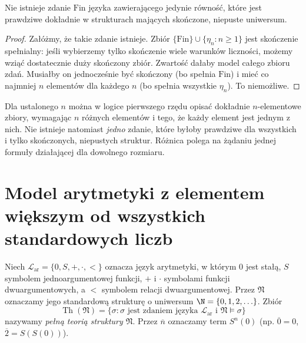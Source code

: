 \begin{wniosek}\label{cor:compactness-no-finiteness-sentence}
Nie istnieje zdanie $\mathrm{Fin}$ języka zawierającego jedynie równość, które jest prawdziwe dokładnie w strukturach mających skończone, niepuste uniwersum.
\end{wniosek}
\begin{proof}
Załóżmy, że takie zdanie istnieje. Zbiór $\{\mathrm{Fin}\}\cup\{\eta_n:n\ge1\}$ jest skończenie spełnialny: jeśli wybierzemy tylko skończenie wiele warunków liczności, możemy wziąć dostatecznie duży skończony zbiór. Zwartość dałaby model całego zbioru zdań. Musiałby on jednocześnie być skończony (bo spełnia $\mathrm{Fin}$) i mieć co najmniej $n$ elementów dla każdego $n$ (bo spełnia wszystkie $\eta_n$). To niemożliwe.
\end{proof}

\begin{uwaga}
Dla ustalonego $n$ można w logice pierwszego rzędu opisać dokładnie $n$-elementowe zbiory, wymagając $n$ różnych elementów i tego, że każdy element jest jednym z nich. Nie istnieje natomiast \emph{jedno} zdanie, które byłoby prawdziwe dla wszystkich i tylko skończonych, niepustych struktur. Różnica polega na żądaniu jednej formuły działającej dla dowolnego rozmiaru.
\end{uwaga}

\section{Model arytmetyki z elementem większym od wszystkich standardowych liczb}\label{sec:compactness-nonstandard}
\begin{definicja}\label{def:compactness-theory-n}
Niech $\mathcal L_{\mathrm{ar}}=\{0,S,+,\cdot,<\}$ oznacza język arytmetyki, w którym $0$ jest stałą, $S$ symbolem jednoargumentowej funkcji, $+$ i $\cdot$ symbolami funkcji dwuargumentowych, a $<$ symbolem relacji dwuargumentowej. Przez $\mathfrak N$ oznaczamy jego standardową strukturę o uniwersum $\N=\{0,1,2,\ldots\}$. Zbiór
\[
\operatorname{Th}(\mathfrak N)=\{\sigma:\sigma\text{ jest zdaniem języka }\mathcal L_{\mathrm{ar}}\text{ i }\mathfrak N\models\sigma\}
\]
nazywamy \emph{pełną teorią struktury $\mathfrak N$}. Przez $\overline n$ oznaczamy term $S^n(0)$ (np. $\overline0=0$, $\overline2=S(S(0))$).
\end{definicja}

